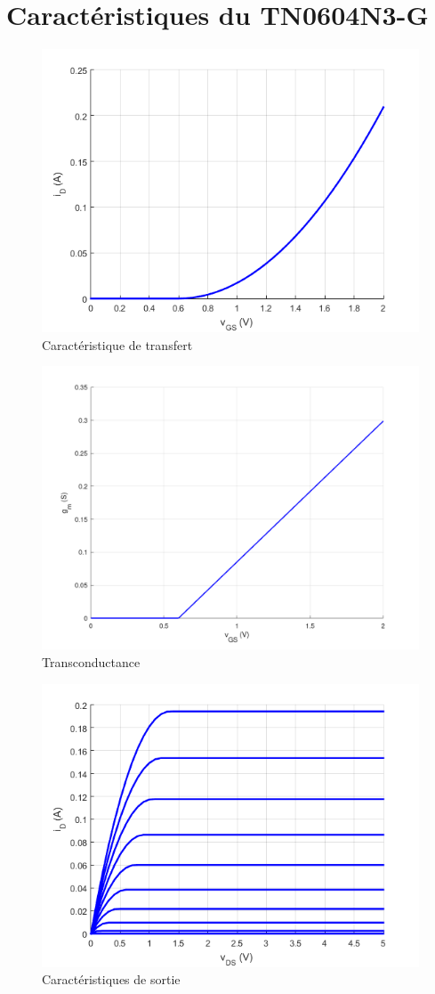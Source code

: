 \documentclass{../template/labo}
\begin{document}
\clearpage
\appendix
\section{Caractéristiques du TN0604N3-G}
\begin{figure}[H]
	\centering
	\includegraphics[width=.8\textwidth]{iD_vGS.png}
	\caption{Caractéristique de transfert}
\end{figure}

\begin{figure}[H]
	\centering
	\includegraphics[width=.8\textwidth]{gm_vGS.png}
	\caption{Transconductance}
\end{figure}

\begin{figure}[H]
	\centering
	\includegraphics[width=.8\textwidth]{iD_vDS.png}
	\caption{Caractéristiques de sortie}
\end{figure}
\end{document}
